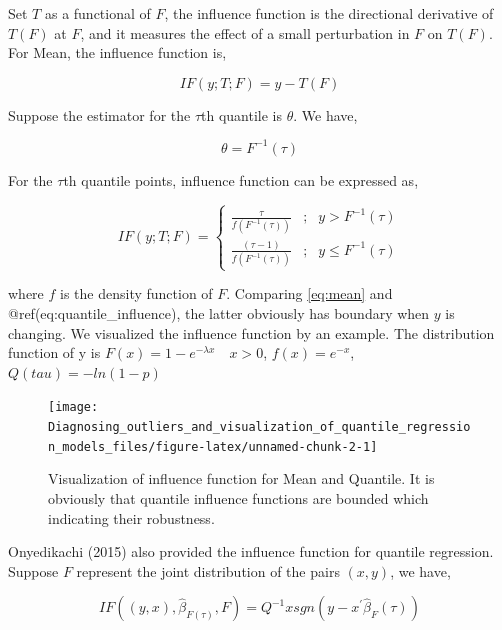 \documentclass[11pt,a4paper,]{article}
\theoremstyle{definition}
\theoremstyle{definition}
\theoremstyle{remark}
\begin{document}
Set \(T\) as a functional of \(F\), the influence function is the
directional derivative of \(T(F)\) at \(F\), and it measures the effect
of a small perturbation in \(F\) on \(T(F)\). For Mean, the influence
function is,

\begin{equation}
IF(y;T;F)=y-T(F)
\label{eq:mean}
\end{equation}

Suppose the estimator for the \(\tau\)th quantile is \(\theta\). We
have,

\begin{equation}
\theta = F^{-1}(\tau)
\label{eq: theta}
\end{equation}

For the \(\tau\)th quantile points, influence function can be expressed
as,

\begin{equation}
IF(y;T;F)=\left\{
\begin{aligned}
\frac{\tau}{f(F^{-1}(\tau))} & ; & y > F^{-1}(\tau) \\
\frac{(\tau-1)}{f(F^{-1}(\tau))} & ; & y \leq F^{-1}(\tau) 
\end{aligned}
\right.
\label{eq:quantile_influence}
\end{equation}

where \(f\) is the density function of \(F\). Comparing \eqref{eq:mean}
and @ref(eq:quantile\_influence), the latter obviously has boundary when
\(y\) is changing. We visualized the influence function by an example.
The distribution function of y is \(F(x)=1-e^{-\lambda x} \quad x>0\),
\(f(x)=e^{-x}\), \(Q(tau)=-ln(1-p)\)

\begin{figure}

{\centering \texttt{[image: Diagnosing\_outliers\_and\_visualization\_of\_quantile\_regression\_models\_files/figure-latex/unnamed-chunk-2-1]} 

}

\caption{Visualization of influence function for Mean and Quantile. It is obviously that quantile influence functions are bounded which indicating their robustness.}\label{fig:unnamed-chunk-2}
\end{figure}

Onyedikachi (2015) also provided the influence function for quantile
regression. Suppose \(F\) represent the joint distribution of the pairs
\((x,y)\), we have,

\begin{equation}
IF((y,x),\hat{\beta}_{F(\tau)},F)=Q^{-1}xsgn(y-x^{'}\hat{\beta}_{F}(\tau))
\label{eq:quantile_regression_influence}
\end{equation}
\end{document}
